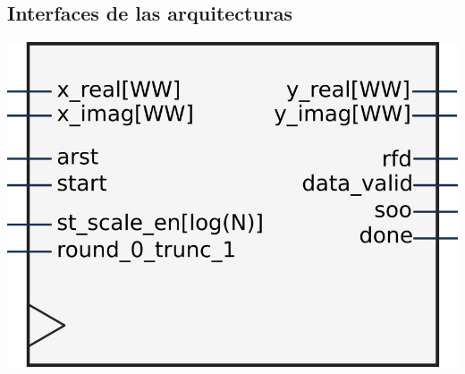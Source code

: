 \subsection{Interfaces de las arquitecturas}
\begin{frame}{}%
  \begin{center}
    \advance\leftskip-0.2cm
    \includegraphics[scale=0.5]{./figures/arcInterf.png}
  \end{center}
\end{frame}